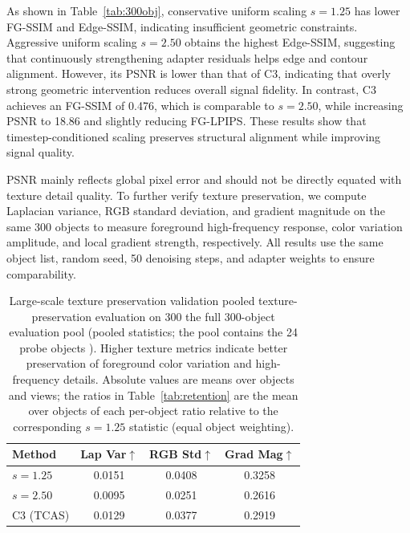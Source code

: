 \documentclass[times,twocolumn,final]{elsarticle}
\providecommand{\DIFadd}[1]{{\protect\color{blue} \sf #1}} %
\providecommand{\DIFdel}[1]{{\protect\color{red} \scriptsize #1}} %
\providecommand{\DIFaddFL}[1]{\DIFadd{#1}} %
\providecommand{\DIFdelFL}[1]{\DIFdel{#1}} %
\providecommand{\DIFaddbeginFL}{} %
\providecommand{\DIFaddendFL}{} %
\providecommand{\DIFdelbeginFL}{} %
\providecommand{\DIFdelendFL}{} %
\newcommand{\DIFscaledelfig}{0.5}
\newlength{\DIFdelgraphicswidth} %
\newlength{\DIFdelgraphicsheight} %
\newcommand{\DIFaddincludegraphics}[2][]{{\color{blue}\fbox{\DIFOincludegraphics[#1]{#2}}}} %
\newcommand{\DIFdelincludegraphics}[2][]{%
\sbox{\DIFdelgraphicsbox}{\DIFOincludegraphics[#1]{#2}}%
\settoboxwidth{\DIFdelgraphicswidth}{\DIFdelgraphicsbox} %
\settoboxtotalheight{\DIFdelgraphicsheight}{\DIFdelgraphicsbox} %
\scalebox{\DIFscaledelfig}{%
\parbox[b]{\DIFdelgraphicswidth}{\usebox{\DIFdelgraphicsbox}\\[-\baselineskip] \rule{\DIFdelgraphicswidth}{0em}}\llap{\resizebox{\DIFdelgraphicswidth}{\DIFdelgraphicsheight}{%
\setlength{\unitlength}{\DIFdelgraphicswidth}%
\begin{picture}(1,1)%
\thicklines\linethickness{2pt} %
{\color[rgb]{1,0,0}\put(0,0){\framebox(1,1){}}}%
{\color[rgb]{1,0,0}\put(0,0){\line( 1,1){1}}}%
{\color[rgb]{1,0,0}\put(0,1){\line(1,-1){1}}}%
\end{picture}%
}\hspace*{3pt}}} %
} %
\DeclareRobustCommand{\DIFaddbeginFL}{\DIFOaddbeginFL \let\includegraphics\DIFaddincludegraphics} %
\DeclareRobustCommand{\DIFaddendFL}{\DIFOaddendFL \let\includegraphics\DIFOincludegraphics} %
\DeclareRobustCommand{\DIFdelbeginFL}{\DIFOdelbeginFL \let\includegraphics\DIFdelincludegraphics} %
\DeclareRobustCommand{\DIFdelendFL}{\DIFOaddendFL \let\includegraphics\DIFOincludegraphics} %
\begin{document}
As shown in Table~\ref{tab:300obj}, conservative uniform scaling $s = 1.25$ has lower FG-SSIM and Edge-SSIM, indicating insufficient geometric constraints. Aggressive uniform scaling $s = 2.50$ obtains the highest Edge-SSIM, suggesting that continuously strengthening adapter residuals helps edge and contour alignment. However, its PSNR is lower than that of C3, indicating that overly strong geometric intervention reduces overall signal fidelity. In contrast, C3 achieves an FG-SSIM of 0.476, which is comparable to $s = 2.50$, while increasing PSNR to 18.86 and slightly reducing FG-LPIPS. These results show that timestep-conditioned scaling preserves structural alignment while improving signal quality.

PSNR mainly reflects global pixel error and should not be directly equated with texture detail quality. To further verify texture preservation, we compute Laplacian variance, RGB standard deviation, and gradient magnitude on the same 300 objects to measure foreground high-frequency response, color variation amplitude, and local gradient strength, respectively. All results use the same object list, random seed, 50 denoising steps, and adapter weights to ensure comparability.


\begin{table}[t]
\centering
\caption{Large-scale \DIFdelbeginFL \DIFdelFL{texture preservation validation }\DIFdelendFL \DIFaddbeginFL \DIFaddFL{pooled texture-preservation evaluation }\DIFaddendFL on \DIFdelbeginFL \DIFdelFL{300 }\DIFdelendFL \DIFaddbeginFL \DIFaddFL{the full 300-object evaluation pool (pooled statistics; the pool contains the 24 probe }\DIFaddendFL objects\DIFaddbeginFL \DIFaddFL{)}\DIFaddendFL . Higher texture metrics indicate better preservation of foreground color variation and high-frequency details. \DIFaddbeginFL \DIFaddFL{Absolute values are means over objects and views; the ratios in Table~\ref{tab:retention} are the mean over objects of each per-object ratio relative to the corresponding $s = 1.25$ statistic (equal object weighting).}\DIFaddendFL }
\label{tab:texture300}
\small
\begin{tabular}{lccc}
\toprule
Method & Lap Var$\uparrow$ & RGB Std$\uparrow$ & Grad Mag$\uparrow$ \\
\midrule
$s = 1.25$ & 0.0151 & 0.0408 & 0.3258 \\
$s = 2.50$ & 0.0095 & 0.0251 & 0.2616 \\
C3 (TCAS) & 0.0129 & 0.0377 & 0.2919 \\
\bottomrule
\end{tabular}
\end{table}
\end{document}
